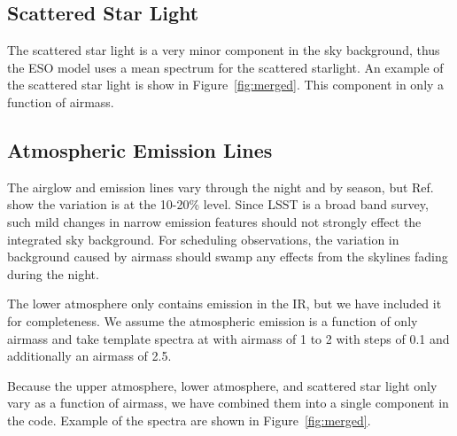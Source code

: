 \documentclass[]{spie}
\begin{document}
  

\subsection{Scattered Star Light}

The scattered star light is a very minor component in the sky background, thus the ESO model uses a mean spectrum for the scattered starlight.  An example of the scattered star light is show in Figure~\ref{fig:merged}. This component in only a function of airmass.


\subsection{Atmospheric Emission Lines}

The airglow and emission lines vary through the night and by season, but Ref.~ show the variation is at the 10-20\% level.  Since LSST is a broad band survey, such mild changes in narrow emission features should not strongly effect the integrated sky background.  For scheduling observations, the variation in background caused by airmass should swamp any effects from the skylines fading during the night.

The lower atmosphere only contains emission in the IR, but we have included it for completeness.  We assume the atmospheric emission is a function of only airmass and take template spectra at with airmass of 1 to 2 with steps of 0.1 and additionally an airmass of 2.5.

Because the upper atmosphere, lower atmosphere, and scattered star light only vary as a function of airmass, we have combined them into a single component in the code. Example of the spectra are shown in Figure~\ref{fig:merged}.
\end{document}
